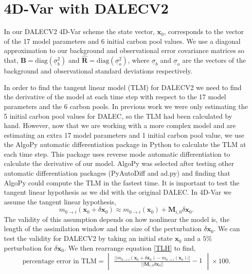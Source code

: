 \documentclass[11pt]{article}
\begin{document}
\section{4D-Var with DALECV2} \label{sec:4dvardalec}

In our DALECV2 4D-Var scheme the state vector, $\textbf{x}_0$, corresponds to the vector of the 17 model parameters and 6 initial carbon pool values. We use a diagonal approximation to our background and observational error covariance matrices so that, 
$\textbf{B}=\text{diag}(\underline{\sigma}_b^2)$ and $\hat{\textbf{R}}=\text{diag}(\underline{\sigma}_o^2 )$,
where $\underline{\sigma}_b$ and $\underline{\sigma}_o$ are the vectors of the background and observational standard deviations respectively.

In order to find the tangent linear model (TLM) for DALECV2 we need to find the derivative of the model at each time step with respect to the 17 model parameters and the 6 carbon pools. In previous work we were only estimating the 5 initial carbon pool values for DALEC, so the TLM had been calculated by hand. However, now that we are working with a more complex model and are estimating an extra 17 model parameters and 1 initial carbon pool value, we use the AlgoPy automatic differentiation package in Python to calculate the TLM at each time step. This package uses reverse mode automatic differentiation to calculate the derivative of our model. AlgoPy was selected after testing other automatic differentiation packages (PyAutoDiff and ad.py) and finding that AlgoPy could compute the TLM in the fastest time. It is important to test the tangent linear hypothesis as we did with the original DALEC. In 4D-Var we assume the tangent linear hypothesis,
\begin{equation}
m_{0\rightarrow i}(\mathbf{x}_0+\delta\mathbf{x}_0) \approx m_{0 \rightarrow i}(\mathbf{x}_0) + \mathbf{M}_{i,0}\delta\mathbf{x}_0. \label{TLH}
\end{equation}
The validity of this assumption depends on how nonlinear the model is, the length of the assimilation window and the size of the perturbation $\delta\mathbf{x}_0$. We can test the validity for DALECV2 by taking an initial state $\mathbf{x}_0$ and a $5\%$ perturbation for $\delta\mathbf{x}_0$. We then rearrange equation \ref{TLH} to find, 
\begin{equation}
\text{percentage error in TLM} = \begin{vmatrix} \frac{|| m_{0\rightarrow i}(\mathbf{x}_0+\delta\mathbf{x}_0) - m_{0 \rightarrow i}(\mathbf{x}_0) ||}{|| \mathbf{M}_{i,0}\delta\mathbf{x}_0||} - 1 \end{vmatrix} \times 100.
\end{equation}
\end{document}

